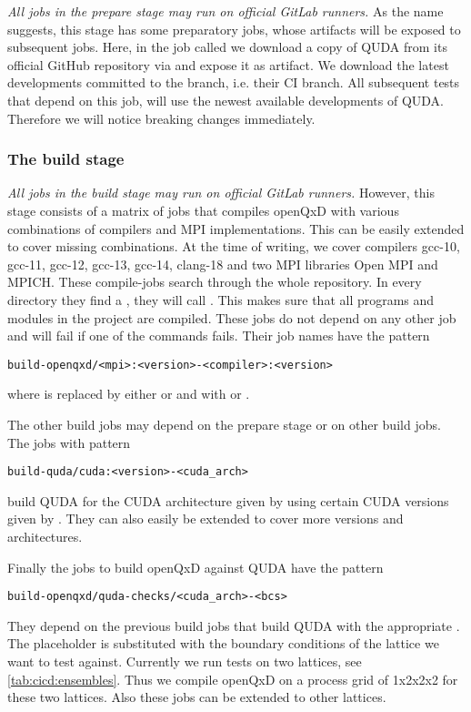 \emph{All jobs in the prepare stage may run on official GitLab runners.} As the name suggests, this stage has some preparatory jobs, whose artifacts will be exposed to subsequent jobs. Here, in the job called  we download a copy of QUDA from its official GitHub repository \cite{github:quda} via  and expose it as artifact. We download the latest developments committed to the  branch, i.e. their CI branch. All subsequent tests that depend on this job, will use the newest available developments of QUDA. Therefore we will notice breaking changes immediately.

\subsubsection{The build stage}
\label{sec:cicd:pipeline:gitlab:build}

\emph{All jobs in the build stage may run on official GitLab runners.} However, this stage consists of a matrix of jobs that compiles openQxD with various combinations of compilers and MPI implementations. This can be easily extended to cover missing combinations. At the time of writing, we cover compilers gcc-10, gcc-11, gcc-12, gcc-13, gcc-14, clang-18 and two MPI libraries Open MPI\cite{online:openmpi} and MPICH\cite{online:mpich}. These compile-jobs search through the whole repository. In every directory they find a , they will call . This makes sure that all programs and modules in the project are compiled. These jobs do not depend on any other job and will fail if one of the commands fails. Their job names have the pattern
\begin{verbatim}
build-openqxd/<mpi>:<version>-<compiler>:<version>
\end{verbatim}
where  is replaced by either  or  and  with  or .

The other build jobs may depend on the prepare stage or on other build jobs. The jobs with pattern
\begin{verbatim}
build-quda/cuda:<version>-<cuda_arch>
\end{verbatim}
build QUDA for the CUDA architecture given by  using certain CUDA versions given by . They can also easily be extended to cover more versions and architectures.

Finally the jobs to build openQxD against QUDA have the pattern
\begin{verbatim}
build-openqxd/quda-checks/<cuda_arch>-<bcs>
\end{verbatim}
They depend on the previous build jobs that build QUDA with the appropriate . The placeholder  is substituted with the boundary conditions of the lattice we want to test against. Currently we run tests on two lattices, see \cref{tab:cicd:ensembles}. Thus we compile openQxD on a process grid of 1x2x2x2 for these two lattices. Also these jobs can be extended to other lattices.

